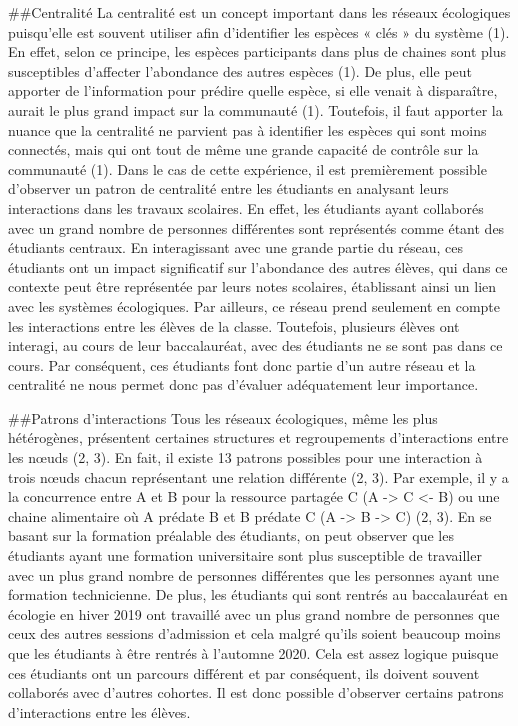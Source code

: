 \documentclass[9pt,twocolumn,twoside,]{pnas-new}
\begin{document}
\#\#Centralité La centralité est un concept important dans les réseaux
écologiques puisqu'elle est souvent utiliser afin d'identifier les
espèces « clés » du système (1). En effet, selon ce principe, les
espèces participants dans plus de chaines sont plus susceptibles
d'affecter l'abondance des autres espèces (1). De plus, elle peut
apporter de l'information pour prédire quelle espèce, si elle venait à
disparaître, aurait le plus grand impact sur la communauté (1).
Toutefois, il faut apporter la nuance que la centralité ne parvient pas
à identifier les espèces qui sont moins connectés, mais qui ont tout de
même une grande capacité de contrôle sur la communauté (1). Dans le cas
de cette expérience, il est premièrement possible d'observer un patron
de centralité entre les étudiants en analysant leurs interactions dans
les travaux scolaires. En effet, les étudiants ayant collaborés avec un
grand nombre de personnes différentes sont représentés comme étant des
étudiants centraux. En interagissant avec une grande partie du réseau,
ces étudiants ont un impact significatif sur l'abondance des autres
élèves, qui dans ce contexte peut être représentée par leurs notes
scolaires, établissant ainsi un lien avec les systèmes écologiques. Par
ailleurs, ce réseau prend seulement en compte les interactions entre les
élèves de la classe. Toutefois, plusieurs élèves ont interagi, au cours
de leur baccalauréat, avec des étudiants ne se sont pas dans ce cours.
Par conséquent, ces étudiants font donc partie d'un autre réseau et la
centralité ne nous permet donc pas d'évaluer adéquatement leur
importance.

\#\#Patrons d'interactions Tous les réseaux écologiques, même les plus
hétérogènes, présentent certaines structures et regroupements
d'interactions entre les nœuds (2, 3). En fait, il existe 13 patrons
possibles pour une interaction à trois nœuds chacun représentant une
relation différente (2, 3). Par exemple, il y a la concurrence entre A
et B pour la ressource partagée C (A -\textgreater{} C \textless- B) ou
une chaine alimentaire où A prédate B et B prédate C (A -\textgreater{}
B -\textgreater{} C) (2, 3). En se basant sur la formation préalable des
étudiants, on peut observer que les étudiants ayant une formation
universitaire sont plus susceptible de travailler avec un plus grand
nombre de personnes différentes que les personnes ayant une formation
technicienne. De plus, les étudiants qui sont rentrés au baccalauréat en
écologie en hiver 2019 ont travaillé avec un plus grand nombre de
personnes que ceux des autres sessions d'admission et cela malgré qu'ils
soient beaucoup moins que les étudiants à être rentrés à l'automne 2020.
Cela est assez logique puisque ces étudiants ont un parcours différent
et par conséquent, ils doivent souvent collaborés avec d'autres
cohortes. Il est donc possible d'observer certains patrons
d'interactions entre les élèves.
\end{document}

